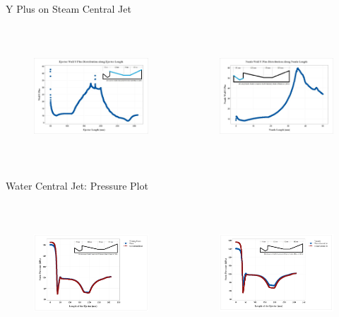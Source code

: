 \begin{frame}{Y Plus on Steam Central Jet}
  \begin{columns}
   \begin{figure}
    \centering
    \includegraphics[height=4.5cm]{images/EjectorWallYplus.jpg}
   \end{figure}
   \begin{figure}
    \centering
    \includegraphics[height=4.5cm]{images/nozzlewallyplus.jpg}
   \end{figure}
  \end{columns}
\end{frame}

\begin{frame}{Water Central Jet: Pressure Plot}
   \begin{columns}
   \begin{figure}
    \centering
    \includegraphics[height=4.5cm]{images/wcwfluids.png}
   \end{figure}
   \begin{figure}
    \centering
    \includegraphics[height=4.5cm]{images/wcandsc.png}
   \end{figure}
  \end{columns}
\end{frame}

